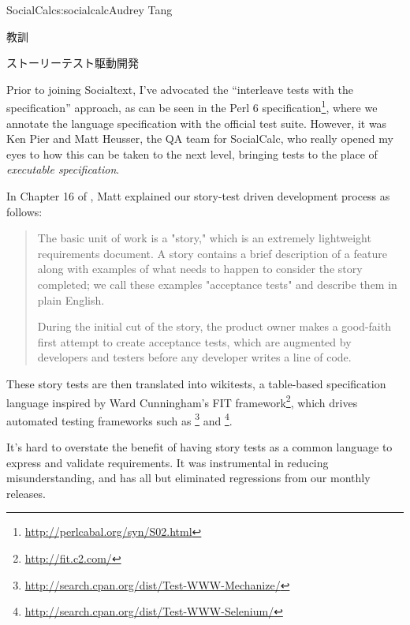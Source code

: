 \begin{aosachapter}{SocialCalc}{s:socialcalc}{Audrey Tang}
\begin{aosasect1}{教訓}
\begin{aosasect2}{ストーリーテスト駆動開発}

Prior to joining Socialtext, I've advocated the ``interleave tests
with the specification'' approach, as can be seen in the Perl 6
specification\footnote{\url{http://perlcabal.org/syn/S02.html}}, where
we annotate the language specification with the official test suite.
However, it was Ken Pier and Matt Heusser, the QA team for SocialCalc,
who really opened my eyes to how this can be taken to the next level,
bringing tests to the place of \emph{executable specification}.


In Chapter 16 of \cite{bib:goucher:test}, Matt explained our
story-test driven development process as follows:

\begin{quotation}

  The basic unit of work is a "story," which is an extremely
  lightweight requirements document. A story contains a brief
  description of a feature along with examples of what needs to happen
  to consider the story completed; we call these examples "acceptance
  tests" and describe them in plain English.

  During the initial cut of the story, the product owner makes a
  good-faith first attempt to create acceptance tests, which are
  augmented by developers and testers before any developer writes
  a line of code.

\end{quotation}

These story tests are then translated into wikitests, a table-based
specification language inspired by Ward Cunningham's FIT
framework\footnote{\url{http://fit.c2.com/}}, which drives automated
testing frameworks such as
\footnote{\url{http://search.cpan.org/dist/Test-WWW-Mechanize/}}
and
\footnote{\url{http://search.cpan.org/dist/Test-WWW-Selenium/}}.

It's hard to overstate the benefit of having story tests as a common
language to express and validate requirements. It was instrumental in
reducing misunderstanding, and has all but eliminated regressions from
our monthly releases.

\end{aosasect2}



\end{aosasect1}
\end{aosachapter}
